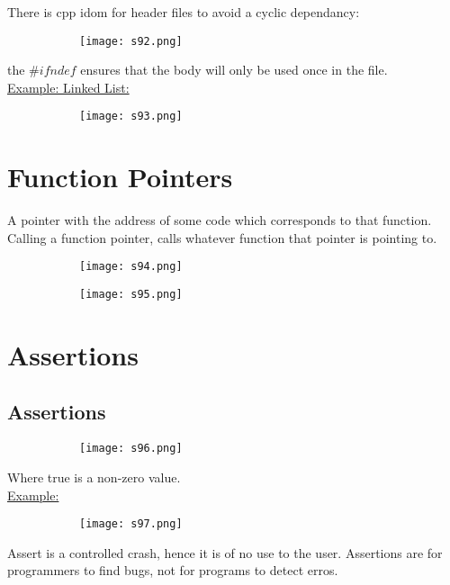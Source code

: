 \documentclass[8pt]{extreport}
\begin{document}
There is cpp idom for header files to avoid a cyclic dependancy:
\begin{figure}[H]
\centering
\begin{subfigure}[b]{0.4\linewidth}
\texttt{[image: s92.png]}
\end{subfigure}
\end{figure}
the $\#ifndef$ ensures that the body will only be used once in the file.\\
\underline{Example: Linked List:}
\begin{figure}[H]
\centering
\begin{subfigure}[b]{0.4\linewidth}
\texttt{[image: s93.png]}
\end{subfigure}
\end{figure}

\section{Function Pointers}
A pointer with the address of some code which corresponds to that function. Calling a function pointer, calls whatever function that pointer is pointing to.
\begin{figure}[H]
\centering
\begin{subfigure}[b]{0.4\linewidth}
\texttt{[image: s94.png]}
\end{subfigure}
\end{figure}
\begin{figure}[H]
\centering
\begin{subfigure}[b]{0.4\linewidth}
\texttt{[image: s95.png]}
\end{subfigure}
\end{figure}
\section{Assertions}

\subsection{Assertions}
\begin{figure}[H]
\centering
\begin{subfigure}[b]{0.4\linewidth}
\texttt{[image: s96.png]}
\end{subfigure}
\end{figure}
Where true is a non-zero value. \\
\underline{Example:}
\begin{figure}[H]
\centering
\begin{subfigure}[b]{0.4\linewidth}
\texttt{[image: s97.png]}
\end{subfigure}
\end{figure}
Assert is a controlled crash, hence it is of no use to the user. Assertions are for programmers to find bugs, not for programs to detect erros.
\end{document}
